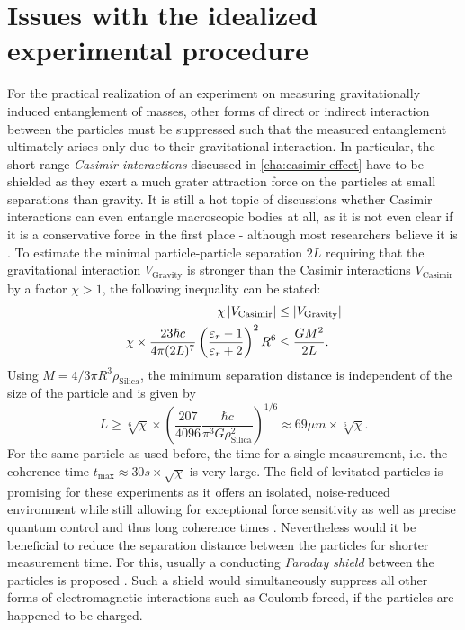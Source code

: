 \section{Issues with the idealized experimental procedure}\label{sec:2:experimental-problems}

For the practical realization of an experiment on measuring gravitationally induced entanglement of masses, other forms of direct or indirect interaction between the particles must be suppressed such that the measured entanglement ultimately arises only due to their gravitational interaction.
In particular, the short-range \emph{Casimir interactions} \cite{Casimir_1948} discussed in \cref{cha:casimir-effect} have to be shielded as they exert a much grater attraction force on the particles at small separations than gravity.
It is still a hot topic of discussions whether Casimir interactions can even entangle macroscopic bodies at all, as it is not even clear if it is a conservative force in the first place - although most researchers believe it is \cite{DeBiase_2012,Yi_2023}.
To estimate the minimal particle-particle separation $2L$ requiring that the gravitational interaction $V_\mathrm{Gravity}$ is stronger than the Casimir interactions $V_\mathrm{Casimir}$ by a factor $\chi > 1$, the following inequality can be stated:
\begin{align}
  \chi \left\lvert V_\mathrm{Casimir}\right\rvert &\leq \left\lvert V_\mathrm{Gravity}\right\rvert \\
  \chi \times \frac{23 \hbar c}{4 \pi (2L)^7} \left(\frac{\varepsilon_r - 1}{\varepsilon_r + 2}\right)^2 R^6 &\leq  \frac{G M^2}{2L} .
\end{align}
Using $M = 4/3 \pi R^3\rho_\mathrm{Silica}$, the minimum separation distance is independent of the size of the particle and is given by
\begin{equation}
  L \geq \sqrt[6]{\chi} \times \left(\frac{207}{4096} \frac{\hbar c}{\pi^3 G \rho_\mathrm{Silica}^2}\right)^{1/6} \approx 69\si{\mu m} \times \sqrt[6]{\chi} .
\end{equation}
For the same particle as used before, the time for a single measurement, i.e. the coherence time $t_\mathrm{max} \approx 30\si{s}\times \sqrt{\chi}$ is very large.
The field of levitated particles is promising for these experiments as it offers an isolated, noise-reduced environment while still allowing for exceptional force sensitivity as well as precise quantum control and thus long coherence times \cite{Aspelmeyer_2024,GonzalezBallestero_2021}.
Nevertheless would it be beneficial to reduce the separation distance between the particles for shorter measurement time.
For this, usually a conducting \emph{Faraday shield} between the particles is proposed \cite{Kamp_2020}.
Such a shield would simultaneously suppress all other forms of electromagnetic interactions such as Coulomb forced, if the particles are happened to be charged.

